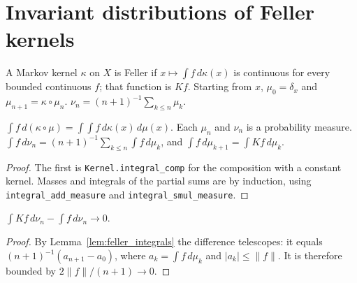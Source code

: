 \section{Invariant distributions of Feller kernels}
\label{sec:feller}

\begin{definition}
\label{def:feller}
\leanok
A Markov kernel $\kappa$ on $X$ is Feller if $x \mapsto \int f\,d\kappa(x)$ is continuous for every bounded
continuous $f$; that function is $Kf$. Starting from $x$, $\mu_0 = \delta_x$ and $\mu_{n+1} = \kappa \circ \mu_n$.
$\nu_n = (n+1)^{-1} \sum_{k \le n} \mu_k$.
\end{definition}

\begin{lemma}[Integrals]
\label{lem:feller_integrals}
\leanok
{}
$\int f\, d(\kappa \circ \mu) = \int\!\int f\, d\kappa(x)\, d\mu(x)$. Each $\mu_n$ and $\nu_n$ is a probability
measure. $\int f\, d\nu_n = (n+1)^{-1} \sum_{k \le n} \int f\, d\mu_k$, and $\int f\, d\mu_{k+1} = \int Kf\, d\mu_k$.
\end{lemma}
\begin{proof}
\leanok
The first is \texttt{Kernel.integral\_comp} for the composition with a constant kernel. Masses and integrals of
the partial sums are by induction, using \texttt{integral\_add\_measure} and \texttt{integral\_smul\_measure}.
\end{proof}

\begin{lemma}
\label{lem:feller_cesaro}
\leanok
{}
$\int Kf\, d\nu_n - \int f\, d\nu_n \to 0$.
\end{lemma}
\begin{proof}
\leanok
By Lemma~\ref{lem:feller_integrals} the difference telescopes: it equals
$(n+1)^{-1}(a_{n+1} - a_0)$, where $a_k = \int f\,d\mu_k$ and $|a_k| \le \|f\|$. It is therefore bounded by
$2\|f\|/(n+1) \to 0$.
\end{proof}

